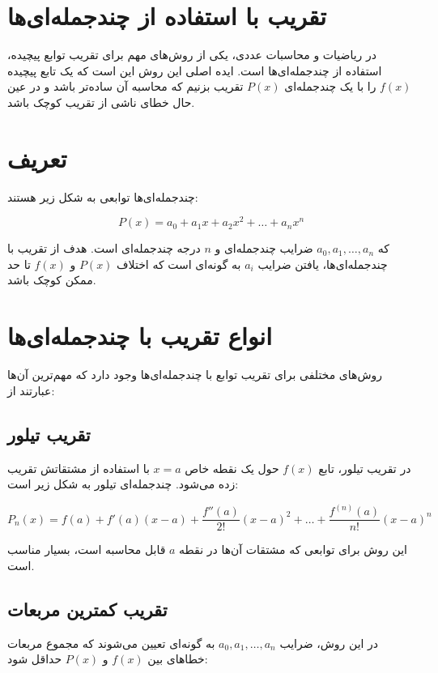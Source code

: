 \section{تقریب با استفاده از چندجمله‌ای‌ها}

در ریاضیات و محاسبات عددی، یکی از روش‌های مهم برای تقریب توابع پیچیده، استفاده از چندجمله‌ای‌ها است. ایده اصلی این روش این است که یک تابع پیچیده \(f(x)\) را با یک چندجمله‌ای \(P(x)\) تقریب بزنیم که محاسبه آن ساده‌تر باشد و در عین حال خطای ناشی از تقریب کوچک باشد.

\section{تعریف}

چندجمله‌ای‌ها توابعی به شکل زیر هستند:

\[
P(x) = a_0 + a_1x + a_2x^2 + \dots + a_nx^n
\]

که \(a_0, a_1, \dots, a_n\) ضرایب چندجمله‌ای و \(n\) درجه چندجمله‌ای است. هدف از تقریب با چندجمله‌ای‌ها، یافتن ضرایب \(a_i\) به گونه‌ای است که اختلاف \(P(x)\) و \(f(x)\) تا حد ممکن کوچک باشد.

\section{انواع تقریب با چندجمله‌ای‌ها}

روش‌های مختلفی برای تقریب توابع با چندجمله‌ای‌ها وجود دارد که مهم‌ترین آن‌ها عبارتند از:

\subsection{تقریب تیلور}

در تقریب تیلور، تابع \(f(x)\) حول یک نقطه خاص \(x = a\) با استفاده از مشتقاتش تقریب زده می‌شود. چندجمله‌ای تیلور به شکل زیر است:

\[
P_n(x) = f(a) + f'(a)(x-a) + \frac{f''(a)}{2!}(x-a)^2 + \dots + \frac{f^{(n)}(a)}{n!}(x-a)^n
\]

این روش برای توابعی که مشتقات آن‌ها در نقطه \(a\) قابل محاسبه است، بسیار مناسب است.

\subsection{تقریب کمترین مربعات}

در این روش، ضرایب \(a_0, a_1, \dots, a_n\) به گونه‌ای تعیین می‌شوند که مجموع مربعات خطاهای بین \(f(x)\) و \(P(x)\) حداقل شود:

